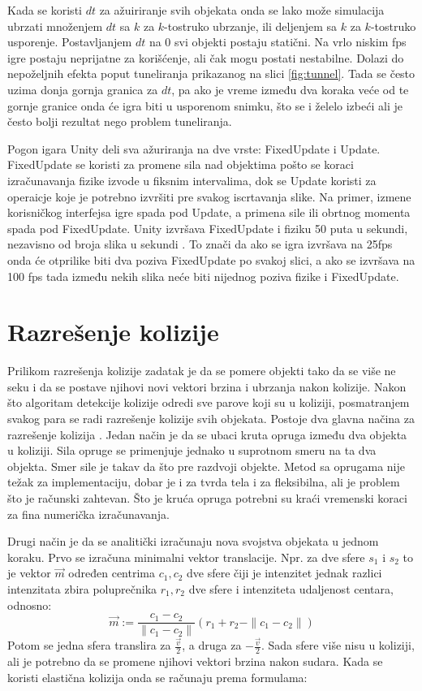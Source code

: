 \documentclass[12pt,oneside]{memoir}
\begin{document}
Kada se koristi $dt$ za ažuiriranje svih objekata onda se lako može simulacija ubrzati množenjem $dt$ 
sa $k$ za $k$-tostruko ubrzanje, ili deljenjem sa $k$ za $k$-tostruko usporenje. Postavljanjem $dt$ na 0 svi 
objekti postaju statični. 
Na vrlo niskim fps igre postaju neprijatne za korišćenje, ali čak mogu postati nestabilne. Dolazi do nepoželjnih efekta 
poput tuneliranja prikazanog na slici \ref{fig:tunnel}. Tada se često uzima donja gornja granica za $dt$, pa 
ako je vreme između dva koraka veće od te gornje granice onda će igra biti u usporenom snimku, što se i želelo izbeći 
ali je često bolji rezultat nego problem tuneliranja.

Pogon igara Unity deli sva ažuriranja na dve vrste: FixedUpdate i Update. 
FixedUpdate se koristi za promene sila nad objektima pošto se koraci izračunavanja fizike izvode u fiksnim intervalima, 
dok se Update koristi za operaicje koje je potrebno izvršiti pre svakog iscrtavanja slike. 
Na primer, izmene korisničkog interfejsa igre spada pod Update, a primena sile ili obrtnog momenta spada pod FixedUpdate.
Unity izvršava FixedUpdate i fiziku 50 puta u sekundi, nezavisno od broja slika u sekundi \cite{unity}.
To znači da ako se igra izvršava na 25fps onda će otprilike biti dva poziva FixedUpdate po svakoj slici,
a ako se izvršava na 100 fps tada između nekih slika neće biti nijednog poziva fizike i FixedUpdate.

\section{Razrešenje kolizije}

Prilikom razrešenja kolizije zadatak je da se pomere objekti tako da se više ne seku i
da se postave njihovi novi vektori brzina i ubrzanja nakon kolizije.
Nakon što algoritam detekcije kolizije odredi sve parove koji su u koliziji, 
posmatranjem svakog para se radi razrešenje kolizije svih objekata.
Postoje dva glavna načina za razrešenje kolizija \cite{Moore}.
Jedan način je da se ubaci kruta opruga između dva objekta u koliziji.
Sila opruge se primenjuje jednako u suprotnom smeru na ta dva objekta.
Smer sile je takav da što pre razdvoji objekte. Metod sa oprugama nije težak 
za implementaciju, dobar je i za tvrda tela i za fleksibilna, ali je problem što je 
računski zahtevan. Što je kruća opruga potrebni su kraći vremenski koraci za fina 
numerička izračunavanja.

Drugi način je da se analitički izračunaju nova svojstva objekata u jednom koraku.
Prvo se izračuna minimalni vektor translacije. Npr. za dve sfere $s_1$ i $s_2$ to je vektor $\vec{m}$
određen centrima $c_1, c_2$ dve sfere čiji je intenzitet jednak razlici intenzitata zbira poluprečnika
$r_1, r_2$ dve sfere i intenziteta udaljenost centara, odnosno:
\[  \vec{m} := \frac{{c_1 - c_2}} {\|{c_1 - c_2}\|} 
 (r_1 + r_2 - \| {c_1 - c_2} \| ) \]
Potom se jedna sfera translira za $ \frac{ \vec{v} }{ 2 }$, a druga za $ -\frac{ \vec{v} }{ 2 }$.
Sada sfere više nisu u koliziji, ali je potrebno da se promene njihovi vektori brzina nakon sudara.
Kada se koristi elastična kolizija onda se računaju prema formulama:
\end{document}
